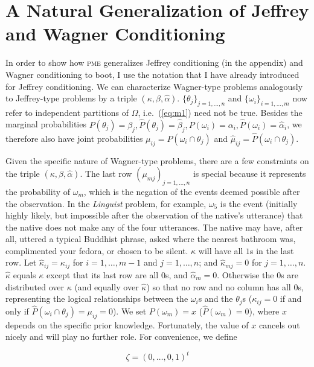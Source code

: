 \documentclass[entropy,article,submit,oneauthor,pdftex,12pt,a4paper]{mdpi}
\newcommand{\intercal}{t}
\begin{document}
\section{A Natural Generalization of Jeffrey and Wagner Conditioning}
\label{Generalization}

In order to show how \textsc{pme} generalizes Jeffrey conditioning (in
the appendix) and Wagner conditioning to boot, I use the notation that
I have already introduced for Jeffrey conditioning. We can
characterize Wagner-type problems analogously to Jeffrey-type problems
by a triple $(\kappa,\beta,\hat{\alpha})$.
$\{\theta_{j}\}_{j=1,\ldots,n}$ and $\{\omega_{i}\}_{i=1,\ldots,m}$
now refer to independent partitions of $\Omega$, i.e.\ (\ref{eq:m1})
need not be true. Besides the marginal probabilities
$P(\theta_{j})=\beta_{j}, \hat{P}(\theta_{j})=\hat{\beta}_{j},
P(\omega_{i})=\alpha_{i},\hat{P}(\omega_{i})=\hat{\alpha}_{i}$, we
therefore also have joint probabilities
$\mu_{ij}=P(\omega_{i}\cap\theta_{j})$ and
$\hat{\mu}_{ij}=\hat{P}(\omega_{i}\cap\theta_{j})$.

Given the specific nature of Wagner-type problems, there are a few
constraints on the triple $(\kappa,\beta,\hat{\alpha})$. The last row
$(\mu_{mj})_{j=1,\ldots,n}$ is special because it represents the
probability of $\omega_{m}$, which is the negation of the events
deemed possible after the observation. In the \emph{Linguist} problem,
for example, $\omega_{5}$ is the event (initially highly likely, but
impossible after the observation of the native's utterance) that the
native does not make any of the four utterances. The native may have,
after all, uttered a typical Buddhist phrase, asked where the nearest
bathroom was, complimented your fedora, or chosen to be silent.
$\kappa$ will have all $1$s in the last row. Let
$\hat{\kappa}_{ij}=\kappa_{ij}$ for $i=1,\ldots,m-1$ and
$j=1,\ldots,n$; and $\hat{\kappa}_{mj}=0$ for $j=1,\ldots,n$.
$\hat{\kappa}$ equals $\kappa$ except that its last row are all $0$s,
and $\hat{\alpha}_{m}=0$. Otherwise the $0$s are distributed over
$\kappa$ (and equally over $\hat{\kappa}$) so that no row and no
column has all $0$s, representing the logical relationships between
the $\omega_{i}$s and the $\theta_{j}$s ($\kappa_{ij}=0$ if and only
if $\hat{P}(\omega_{i}\cap\theta_{j})=\mu_{ij}=0$). We set
$P(\omega_{m})=x$ ($\hat{P}(\omega_{m})=0$), where $x$ depends on the
specific prior knowledge. Fortunately, the value of $x$ cancels out
nicely and will play no further role. For convenience, we define

\begin{equation}
\label{eq:zeta}
\zeta=(0,\ldots,0,1)^{\intercal}
\end{equation}
\end{document}
